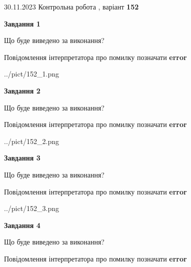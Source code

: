 \documentclass[12pt, ukrainian]{article}
\begin{document}
{{30.11.2023 Контрольна робота , варіант  \No \textbf { 152 }\par}}
{




{\begin {center}\textbf{Завдання 1}\end {center}}\par
Що буде виведено за виконання? \par
Повідомлення інтерпретатора про помилку позначати \textbf{error}

\begin{center}
	{../pict/152_1.png}
\end{center}
\newpage

{\begin {center}\textbf{Завдання 2}\end {center}}\par
Що буде виведено за виконання? \par
Повідомлення інтерпретатора про помилку позначати \textbf{error}

\begin{center}
	{../pict/152_2.png}
\end{center}
\newpage

{\begin {center}\textbf{Завдання 3}\end {center}}\par
Що буде виведено за виконання? \par
Повідомлення інтерпретатора про помилку позначати \textbf{error}

\begin{center}
	{../pict/152_3.png}
\end{center}
\newpage

{\begin {center}\textbf{Завдання 4}\end {center}}\par
Що буде виведено за виконання? \par
Повідомлення інтерпретатора про помилку позначати \textbf{error}

}
\end{document}
